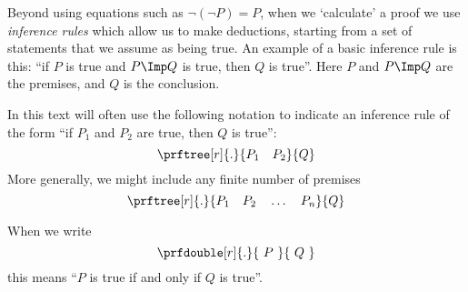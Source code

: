 Beyond using equations such as $\lnot (\lnot P) = P$, when we `calculate' a proof we use \emph{inference rules} which allow us to make deductions, starting from a set of statements that we assume as being true. An example of a basic inference rule is this: ``if $P$ is true and $P \Imp Q$ is true, then $Q$ is true''. Here $P$ and $P \Imp Q$ are the premises, and $Q$ is the conclusion. 

In this text will often use the following notation to indicate an inference rule of the form ``if $P_1$ and $P_2$ are true, then $Q$ is true'': 
\begin{equation}
\prftree[r]{.}{ 
P_1 \quad P_2
}{
Q
} 
\end{equation}
More generally, we might include any finite number of premises
\begin{equation}
\prftree[r]{.}{ 
P_1 \quad P_2 \quad \dots \quad P_n
}{
Q
} 
\end{equation}

When we write 
\begin{equation}
\prfdouble[r]{.}{ 
\ P \ 
}{
\ Q \ 
} 
\end{equation}
this means ``$P$ is true if and only if $Q$ is true''. 








